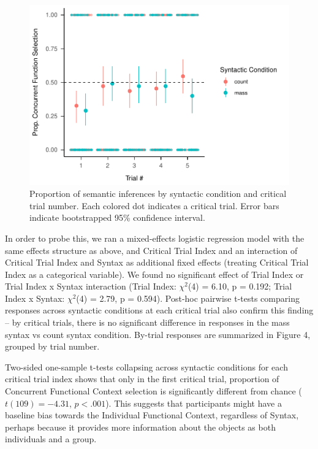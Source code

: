 \documentclass[
  man,floatsintext]{apa6}
\begin{document}
\begin{figure}
\centering
\includegraphics{3_writeup_files/figure-latex/unnamed-chunk-6-1.pdf}
\caption{\label{fig:unnamed-chunk-6}Proportion of semantic inferences by syntactic condition and critical trial number. Each colored dot indicates a critical trial. Error bars indicate bootstrapped 95\% confidence interval.}
\end{figure}

In order to probe this, we ran a mixed-effects logistic regression model with the same effects structure as above, and Critical Trial Index and an interaction of Critical Trial Index and Syntax as additional fixed effects (treating Critical Trial Index as a categorical variable). We found no significant effect of Trial Index or Trial Index x Syntax interaction (Trial Index: \(\chi^2\)(4) = 6.10, p = 0.192; Trial Index x Syntax: \(\chi^2\)(4) = 2.79, p = 0.594). Post-hoc pairwise t-tests comparing responses across syntactic conditions at each critical trial also confirm this finding -- by critical trials, there is no significant difference in responses in the mass syntax vs count syntax condition. By-trial responses are summarized in Figure 4, grouped by trial number.

Two-sided one-sample t-tests collapsing across syntactic conditions for each critical trial index shows that only in the first critical trial, proportion of Concurrent Functional Context selection is significantly different from chance (\(t(109) = -4.31\), \(p < .001\)). This suggests that participants might have a baseline bias towards the Individual Functional Context, regardless of Syntax, perhaps because it provides more information about the objects as both individuals and a group.
\end{document}
